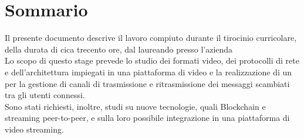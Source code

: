 \chapter*{Sommario}
Il presente documento descrive il lavoro compiuto durante il tirocinio curricolare, della durata di cica trecento ore, dal laureando \myName{} presso l'azienda \nomeAziendaComm{}
\\
Lo scopo di questo stage prevede lo studio dei formati video, dei protocolli di rete e dell'architettura impiegati in una piattaforma di video  e la realizzazione di un  per la gestione di canali di trasmissione e ritrasmissione dei messaggi scambiati tra gli utenti connessi.
\\
Sono stati richiesti, inoltre, studi su nuove tecnologie, quali Blockchain e streaming peer-to-peer, e sulla loro possibile integrazione in una piattaforma di video streaming.